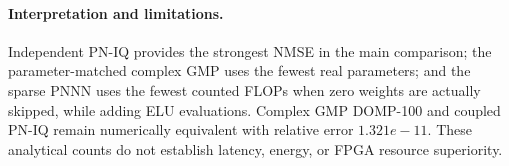 \documentclass[9pt]{article}
\begin{document}
\paragraph{Interpretation and limitations.} Independent PN-IQ provides the strongest NMSE in the main comparison; the parameter-matched complex GMP uses the fewest real parameters; and the sparse PNNN uses the fewest counted FLOPs when zero weights are actually skipped, while adding ELU evaluations. Complex GMP DOMP-100 and coupled PN-IQ remain numerically equivalent with relative error $1.321e-11$. These analytical counts do not establish latency, energy, or FPGA resource superiority.
\end{document}
